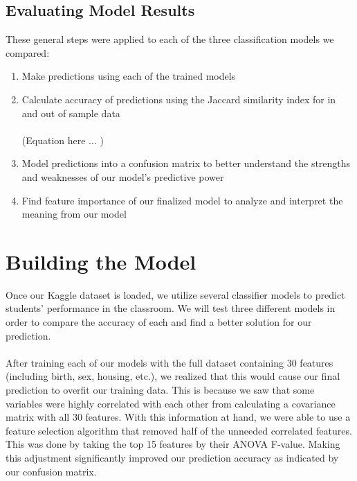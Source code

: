 \documentclass[twoside,twocolumn]{article}
\begin{document}
\subsection{Evaluating Model Results}
These general steps were applied to each of the three classification models we compared:
\begin{enumerate}
	\item Make predictions using each of the trained models
	\item Calculate accuracy of predictions using the Jaccard similarity index for in and out of sample data
\\ \\
(Equation here ... )
	\item Model predictions into a confusion matrix to better understand the strengths and weaknesses of our model’s predictive power
	\item Find feature importance of our finalized model to analyze and interpret the meaning from our model
\end {enumerate}



\section{Building the Model}
Once our Kaggle dataset is loaded, we utilize several classifier models to predict students’ performance in the classroom. We will test three different models in order to compare the accuracy of each and find a better solution for our prediction. 
\\ \\
After training each of our models with the full dataset containing 30 features (including birth, sex, housing, etc.), we realized that this would cause our final prediction to overfit our training data. This is because we saw that some variables were highly correlated with each other from calculating a covariance matrix with all 30 features. With this information at hand, we were able to use a feature selection algorithm that removed half of the unneeded correlated features. This was done by taking the top 15 features by their ANOVA F-value. Making this adjustment significantly improved our prediction accuracy as indicated by our confusion matrix.
\end{document}
